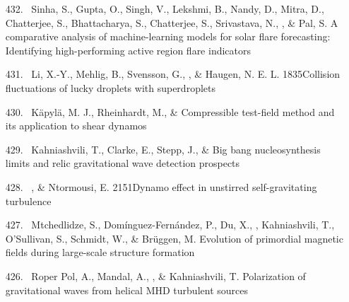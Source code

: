 \begin{itemize}
\item[{432.}~]
Sinha, S., Gupta, O., Singh, V., Lekshmi, B., Nandy, D., Mitra, D., Chatterjee, S., Bhattacharya, S., Chatterjee, S., Srivastava, N., \Brandenburg, \& Pal, S.
{A comparative analysis of machine-learning models for solar flare forecasting: Identifying high-performing active region flare indicators}

\item[{431.}~]
Li, X.-Y., Mehlig, B., Svensson, G., \Brandenburg, \& Haugen, N. E. L.
{1835}{Collision fluctuations of lucky droplets with superdroplets}

\item[{430.}~]
K\"apyl\"a, M. J., Rheinhardt, M., \& \Brandenburg{}
{Compressible test-field method and its application to shear dynamos}

\item[{429.}~]
Kahniashvili, T., Clarke, E., Stepp, J., \& \Brandenburg{}
{Big bang nucleosynthesis limits and relic gravitational wave detection prospects}

\item[{428.}~]
\Brandenburg, \& Ntormousi, E.
{2151}{Dynamo effect in unstirred self-gravitating turbulence}

\item[{427.}~]
Mtchedlidze, S., Dom\'inguez-Fern\'andez, P., Du, X., \Brandenburg, Kahniashvili, T., O'Sullivan, S., Schmidt, W., \& Br\"uggen, M.
{Evolution of primordial magnetic fields during large-scale structure formation}

\item[{426.}~]
Roper Pol, A., Mandal, A., \Brandenburg, \& Kahniashvili, T.
{Polarization of gravitational waves from helical MHD turbulent sources}


\end{itemize}
